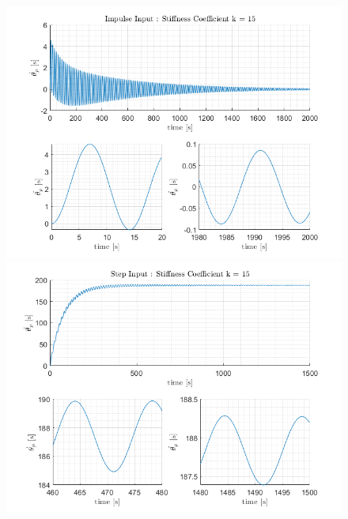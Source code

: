 \documentclass[letterpaper,12pt]{article}
\begin{document}
\begin{figure}[ht]
    \centering
    \includegraphics[scale = .8]{Images/Impulse_k15.png}
    \includegraphics[scale = .8]{Images/StepInput_k15.png}
\end{figure}
\end{document}
